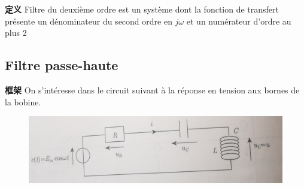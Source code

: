 \documentclass[12pt]{book}
\theoremstyle{definition}\newtheorem{dfn}{Définition}[chapter]
\theoremstyle{plain}\newtheorem{thm}{Théorème}[chapter]
\theoremstyle{plain}\newtheorem{prp}{Proposition}[chapter]
\theoremstyle{plain}\newtheorem{lem}{\bf Lemme}[chapter]
\theoremstyle{plain}\newtheorem{axm}{\bf Axiome}[chapter]
\theoremstyle{plain}\newtheorem{lmm}{\bf Lemme}[chapter]
\theoremstyle{plain}\newtheorem{cor}{\bf Corollaire}[chapter]
\theoremstyle{remark}\newtheorem{rem}{Remarque}[chapter]
\begin{document}
\begin{framed}{\textbf{定义}}
	Filtre du deuxième ordre est un système dont la fonction de transfert présente un dénominateur du second ordre en $j\omega$ et {\color{red} un numérateur d'ordre au plus 2}
\end{framed}

\subsection{Filtre passe-haute}
\begin{framed}{\textbf{框架}}
On s'intéresse dans le circuit suivant à la réponse en tension aux bornes de la bobine.
\end{framed}
\begin{figure}[H]
	\centering
	\includegraphics[scale=0.16]{image//Filtrage//5}
\end{figure}
\end{document}
